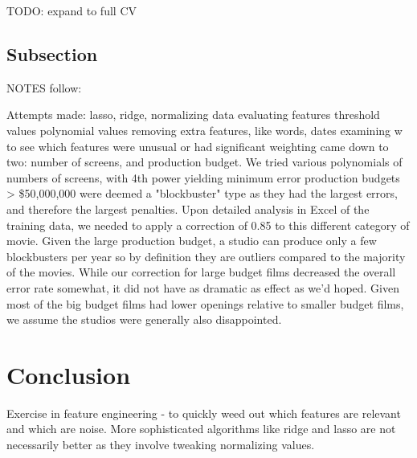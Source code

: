 \documentclass[11pt, oneside]{article}   	%
\begin{document}
TODO: expand to full CV

\subsection*{Subsection}
NOTES follow:

Attempts made:
lasso, ridge, normalizing data
evaluating features
threshold values
polynomial values
removing extra features, like words, dates
examining w to see which features were unusual or had significant weighting
came down to two: number of screens, and production budget. We tried various polynomials of numbers of screens, with 4th power yielding minimum error
production budgets > \$50,000,000 were deemed a "blockbuster" type as they had the largest errors, and therefore the largest penalties. Upon detailed analysis in Excel of the training data, we needed to apply a correction of 0.85 to this different category of movie. Given the large production budget, a studio can produce only a few blockbusters per year so by definition they are outliers compared to the majority of the movies. While our correction for large budget films decreased the overall error rate somewhat, it did not have as dramatic as effect as we'd hoped. Given most of the big budget films had lower openings relative to smaller budget films, we assume the studios were generally also disappointed.

\section*{Conclusion}

Exercise in feature engineering - to quickly weed out which features are relevant and which are noise. More sophisticated algorithms like ridge and lasso are not necessarily better as they involve tweaking normalizing values.
\end{document}
